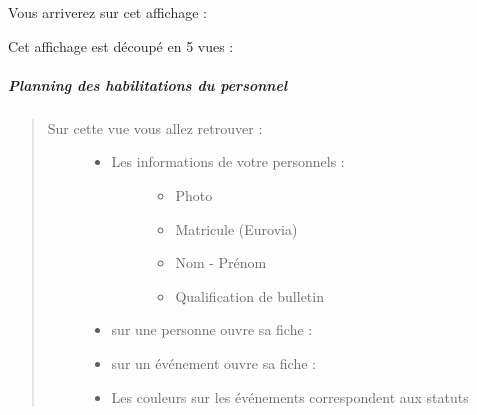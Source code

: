 \documentclass[letterpaper,10pt,english]{sphinxmanual}
\begin{document}
Vous arriverez sur cet affichage :

\noindent{}

Cet affichage est découpé en 5 vues :


\subparagraph{Planning des habilitations du personnel}
\label{\detokenize{fonctionnalitees/habilitation_formation:planning-des-habilitations-du-personnel}}\begin{quote}

\noindent{}
\begin{description}
\item[{Sur cette vue vous allez retrouver :}] \leavevmode\begin{itemize}
\item {} \begin{description}
\item[{Les informations de votre personnels :}] \leavevmode\begin{itemize}
\item {} 
Photo

\item {} 
Matricule (Eurovia)

\item {} 
Nom - Prénom

\item {} 
Qualification de bulletin

\end{itemize}

\end{description}

\item {} 
 sur une personne ouvre sa fiche :
\begin{quote}

\noindent{}
\end{quote}

\item {} 
 sur un événement ouvre sa fiche :
\begin{quote}

\noindent{}
\end{quote}

\item {} 
Les couleurs sur les événements correspondent aux statuts

\end{itemize}

\end{description}
\end{quote}
\end{document}
